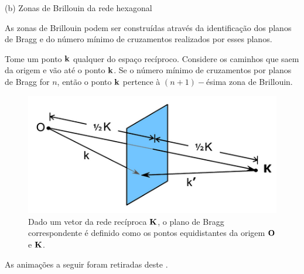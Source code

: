 \documentclass[aspectratio=169]{beamer}
\begin{document}


\begin{frame}{(b) Zonas de Brillouin da rede hexagonal}

As zonas de Brillouin podem ser construídas através da identificação dos planos de Bragg e do número mínimo de cruzamentos realizados por esses planos.

\n

Tome um ponto $\vb{k}$ qualquer do espaço recíproco. Considere os caminhos que saem da origem e vão até o ponto $\vb{k}$. Se o número mínimo de cruzamentos por planos de Bragg for $n$, então o ponto $\vb{k}$ pertence à $(n+1)-$ésima zona de Brillouin.

\begin{figure}[H]
\centering
\includegraphics[width=0.35\linewidth]{fig/bragg-plane.png}
\caption{Dado um vetor da rede recíproca $\vb{K}$, o plano de Bragg correspondente é definido como os pontos equidistantes da origem $\vb{O}$ e $\vb{K}$.}
\label{fig:bragg-plane}
\end{figure}

As animações a seguir foram retiradas deste \href{https://www.doitpoms.ac.uk/tlplib/brillouin_zones/zone_construction.php}{\color{blue}{website}}.

\end{frame}


\end{document}
